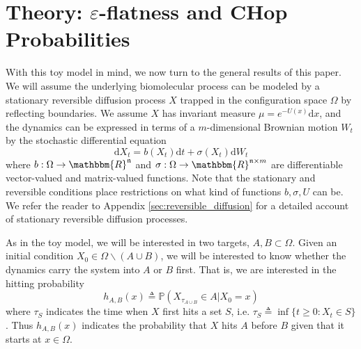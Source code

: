 \documentclass[english, aip, jcp, priprint, graphicx,floatfix]{revtex4-1}
\theoremstyle{plain}
\theoremstyle{definition}
\theoremstyle{plain}
\newcommand{\dimension}{{\mathfrak{n}}}
\begin{document}
\section{Theory: $\varepsilon$-flatness and CHop Probabilities}\label{sec:model_formulation}

With this toy model in mind, we now turn to the general results of this paper. We will assume the underlying biomolecular process can be modeled by a stationary reversible diffusion process $X$ trapped in the configuration space $\Omega$ by reflecting boundaries.  We assume $X$ has invariant
measure ${\mu}= e^{- U (x)} \mathrm{d} x$, and the dynamics can be expressed in terms of a $m$-dimensional Brownian motion $W_t$ by the stochastic differential equation
\begin{equation}\label{equ:general_sde}\mathrm{d} X_t = b (X_t) \mathrm{d} t + \sigma (X_t) \mathrm{d} W_t \end{equation}
where $b: \Omega \rightarrow \mathbbm{R}^\dimension$ and $\sigma :
\Omega \rightarrow \mathbbm{R}^{\dimension \times m}$ are differentiable vector-valued
and matrix-valued functions.  Note that the stationary and reversible conditions place restrictions on what kind of functions $b,\sigma,U$ can be.  We refer the reader to Appendix \ref{sec:reversible_diffusion} for a detailed account of stationary reversible diffusion processes.

As in the toy model, we will be interested in two targets, $A,B\subset \Omega$.  Given an initial condition $X_0\in \Omega \backslash (A\cup B)$, we will be interested to know whether the dynamics carry the system into $A$ or $B$ first.  That is, we are interested in the hitting probability
\[ h_{A, B}(x) \triangleq \mathbb{P}(X_{\tau_{A\cup B}}\in A|X_0=x)\]
where $\tau_S$ indicates the time when $X$ first hits a set $S$, i.e. $\tau_S \triangleq \inf \{ t \geqslant 0 : X_t \in S \}$.  Thus $h_{A,B}(x)$ indicates the probability that $X$ hits $A$ before $B$ given that it starts at $x\in\Omega$. 
\end{document}
